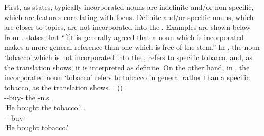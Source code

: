 First,
as  states,
typically incorporated nouns are {indefinite} and/or {non-specific},
which are features correlating with focus.
Definite and/or specific nouns, which are closer to topics,
are not incorporated into the .
Examples are shown below from .
 states that
``[i]t is generally agreed that a noun which is incorporated makes a more general reference than one which is free of the  stem.''
In \Next[a], the noun `tobacco',which is not incorporated into the ,
refers to specific tobacco, and, as the translation shows,
it is interpreted as definite.
On the other hand, in \Next[b],
the incorporated noun `tobacco' refers to tobacco in general rather than a specific tobacco, as the translation shows.
%
\ex.  ()
 \ag.    \\
       --buy- the -n.s. \\
       `He bought the tobacco.'
 \bg.  \\
      ---buy- \\
      `He bought tobacco.'
      \hfill{\cite[10]{woodbury75a}}

